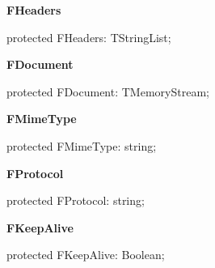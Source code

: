 \documentclass{report}
\newif\ifpdf
\begin{document}
\begin{list}{}
\begin{flushleft}
\ifpdf
\end{flushleft}
\fi


\par  \label{httpsend.THTTPSend-FHeaders}
\item[\textbf{FHeaders}\hfill]
\ifpdf
\begin{flushleft}
\fi
\begin{ttfamily}
protected FHeaders: TStringList;\end{ttfamily}

\ifpdf
\end{flushleft}
\fi


\par  \label{httpsend.THTTPSend-FDocument}
\item[\textbf{FDocument}\hfill]
\ifpdf
\begin{flushleft}
\fi
\begin{ttfamily}
protected FDocument: TMemoryStream;\end{ttfamily}

\ifpdf
\end{flushleft}
\fi


\par  \label{httpsend.THTTPSend-FMimeType}
\item[\textbf{FMimeType}\hfill]
\ifpdf
\begin{flushleft}
\fi
\begin{ttfamily}
protected FMimeType: string;\end{ttfamily}

\ifpdf
\end{flushleft}
\fi


\par  \label{httpsend.THTTPSend-FProtocol}
\item[\textbf{FProtocol}\hfill]
\ifpdf
\begin{flushleft}
\fi
\begin{ttfamily}
protected FProtocol: string;\end{ttfamily}

\ifpdf
\end{flushleft}
\fi


\par  \label{httpsend.THTTPSend-FKeepAlive}
\item[\textbf{FKeepAlive}\hfill]
\ifpdf
\begin{flushleft}
\fi
\begin{ttfamily}
protected FKeepAlive: Boolean;\end{ttfamily}


\end{flushleft}
\end{list}
\end{document}
